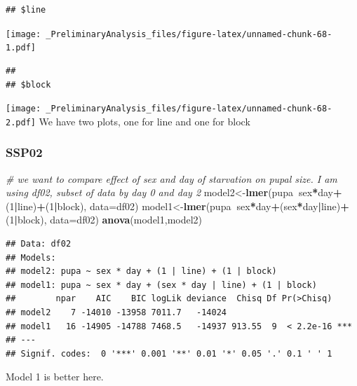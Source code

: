 \documentclass[
]{article}
\newenvironment{Shaded}{\begin{snugshade}}{\end{snugshade}}
\newcommand{\CommentTok}[1]{\textcolor[rgb]{0.56,0.35,0.01}{\textit{#1}}}
\newcommand{\DataTypeTok}[1]{\textcolor[rgb]{0.13,0.29,0.53}{#1}}
\newcommand{\DecValTok}[1]{\textcolor[rgb]{0.00,0.00,0.81}{#1}}
\newcommand{\KeywordTok}[1]{\textcolor[rgb]{0.13,0.29,0.53}{\textbf{#1}}}
\newcommand{\NormalTok}[1]{#1}
\newcommand{\OperatorTok}[1]{\textcolor[rgb]{0.81,0.36,0.00}{\textbf{#1}}}
\begin{document}
\begin{verbatim}
## $line
\end{verbatim}

\texttt{[image: \_PreliminaryAnalysis\_files/figure-latex/unnamed-chunk-68-1.pdf]}

\begin{verbatim}
## 
## $block
\end{verbatim}

\texttt{[image: \_PreliminaryAnalysis\_files/figure-latex/unnamed-chunk-68-2.pdf]}
We have two plots, one for line and one for block

\hypertarget{ssp02}{%
\subsubsection{SSP02}\label{ssp02}}

\begin{Shaded}
\begin{Highlighting}[]
\CommentTok{# we want to compare effect of sex and day of starvation on pupal size. I am using df02, subset of data by day 0 and day 2}
\NormalTok{model2<-}\KeywordTok{lmer}\NormalTok{(pupa}\OperatorTok{~}\NormalTok{sex}\OperatorTok{*}\NormalTok{day}\OperatorTok{+}\NormalTok{(}\DecValTok{1}\OperatorTok{|}\NormalTok{line)}\OperatorTok{+}\NormalTok{(}\DecValTok{1}\OperatorTok{|}\NormalTok{block), }\DataTypeTok{data=}\NormalTok{df02)}
\NormalTok{model1<-}\KeywordTok{lmer}\NormalTok{(pupa}\OperatorTok{~}\NormalTok{sex}\OperatorTok{*}\NormalTok{day}\OperatorTok{+}\NormalTok{(sex}\OperatorTok{*}\NormalTok{day}\OperatorTok{|}\NormalTok{line)}\OperatorTok{+}\NormalTok{(}\DecValTok{1}\OperatorTok{|}\NormalTok{block), }\DataTypeTok{data=}\NormalTok{df02)}
\KeywordTok{anova}\NormalTok{(model1,model2)}
\end{Highlighting}
\end{Shaded}

\begin{verbatim}
## Data: df02
## Models:
## model2: pupa ~ sex * day + (1 | line) + (1 | block)
## model1: pupa ~ sex * day + (sex * day | line) + (1 | block)
##        npar    AIC    BIC logLik deviance  Chisq Df Pr(>Chisq)    
## model2    7 -14010 -13958 7011.7   -14024                         
## model1   16 -14905 -14788 7468.5   -14937 913.55  9  < 2.2e-16 ***
## ---
## Signif. codes:  0 '***' 0.001 '**' 0.01 '*' 0.05 '.' 0.1 ' ' 1
\end{verbatim}

Model 1 is better here.
\end{document}
